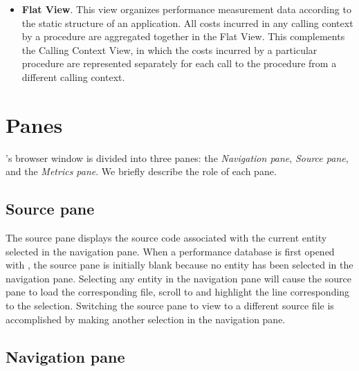 \begin{itemize}
\item \textbf{Flat View}.
  This view organizes performance measurement data according to the static structure of an application.
  All costs incurred in any calling context by a procedure are aggregated together in the Flat View.
  This complements the Calling Context View, in which the costs incurred by a particular procedure are represented separately for each call to the procedure from a different calling context.

\end{itemize}



\section{Panes}
\label{sec:hpcviewer:panes}

\hpcviewer{}'s browser window is divided into three panes: the \emph{Navigation pane}, \emph{Source pane}, and the \emph{Metrics pane}.
We briefly describe the role of each pane.


\subsection{Source pane}

The source pane displays the source code associated with the current entity selected in the navigation pane.
When a performance database is first opened with \hpcviewer{}, the source pane is initially blank because no entity has been selected in the navigation pane.
Selecting any entity in the navigation pane will cause the source pane to load the corresponding file, scroll to and highlight the line corresponding to the selection.
Switching the source pane to view to a different source file is accomplished by making another selection in the navigation pane.


\subsection{Navigation pane}

